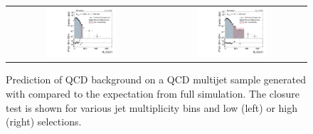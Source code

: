 \begin{figure}[!hp]
\begin{tabular}{cc}
                \includegraphics[width=0.49\textwidth]{figures/MHT_JetBin4_HTlow_madgraph_DR53X_chs_TuneZ2star_pt10_withoutPUReweighting_UseRebCorrection_v1.pdf} &
                \includegraphics[width=0.49\textwidth]{figures/MHT_JetBin4_HThigh_madgraph_DR53X_chs_TuneZ2star_pt10_withoutPUReweighting_UseRebCorrection_v1.pdf}\\

  \end{tabular}
  \caption{Prediction of QCD background on a QCD multijet sample generated with \madgraph compared to the expectation from full simulation. The closure test is shown for various jet multiplicity bins and low (left) or high (right) \HT selections.}
  \label{fig:qcd_rs_closure}
\end{figure}
